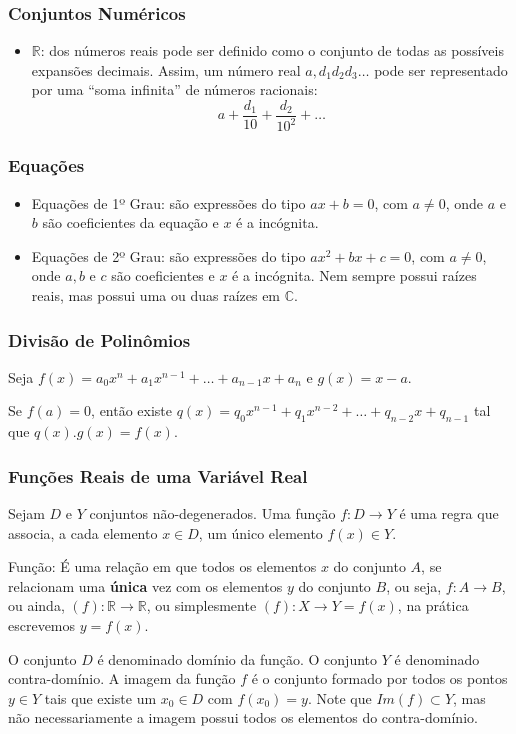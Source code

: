 \documentclass[hyperref={pdfpagelabels=false}]{beamer}
\begin{document}
\begin{frame}
\frametitle{Conjuntos Numéricos}

\begin{itemize}
 \item $\mathbb{R}$: \pause dos números reais pode ser definido como o conjunto de todas as possíveis expansões decimais. Assim, um número real $a,d_{1}d_{2}d_{3}\dots$ pode ser representado por uma ``soma infinita'' de números racionais: $$a + \frac{d_1}{10} + \frac{d_2}{10^2} + \dots $$
\end{itemize}


\end{frame}

\begin{frame}
\frametitle{Equações}

\begin{itemize}
 \item Equações de 1º Grau: \pause são expressões do tipo $ax+b=0$, com $a \neq 0$, onde $a$ e $b$ são coeficientes da equação e $x$ é a incógnita. \pause
 \item Equações de 2º Grau: \pause são expressões do tipo $ax^{2} + bx + c = 0$, com $a \neq 0$, onde $a,b$ e $c$ são coeficientes e $x$ é a incógnita. Nem sempre possui raízes reais, mas possui uma ou duas raízes em $\mathbb{C}$.
\end{itemize}

\end{frame}

\begin{frame}
\frametitle{Divisão de Polinômios}

Seja $f(x) = a_0x^n+a_1x^{n-1}+\dots+a_{n-1}x+a_n$ e $g(x)=x-a$. 

Se $f(a)=0$, então existe $q(x)=q_0x^{n-1}+q_1x^{n-2}+\dots+q_{n-2}x+q_{n-1}$ tal que $q(x).g(x)=f(x)$.


\end{frame}

\begin{frame}
\frametitle{Funções Reais de uma Variável Real}

Sejam $D$ e $Y$ conjuntos não-degenerados. Uma função $f:D \rightarrow Y$ é uma regra que associa, a cada elemento $x \in D$, um único elemento $f(x) \in Y$. \pause

Função: \pause É uma relação em que todos os elementos $x$ do conjunto $A$, se relacionam uma {\bf única} vez com os elementos $y$ do conjunto $B$, ou seja, $f: A \rightarrow B$, ou ainda, $(f): \mathbb{R} \rightarrow \mathbb{R}$, ou simplesmente $(f): X\rightarrow Y = f(x)$, na prática escrevemos $y = f(x)$. \pause

O conjunto $D$ é denominado domínio da função. O conjunto $Y$ é denominado contra-domínio. A imagem da função $f$ é o conjunto formado por todos os pontos $y \in Y$ tais que existe um $x_0 \in D$ com $f(x_0) = y$. Note que $Im(f) \subset Y$, mas não necessariamente a imagem possui todos os elementos do contra-domínio.
\end{frame}
\end{document}
